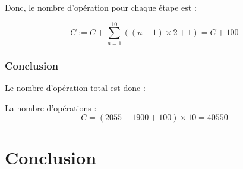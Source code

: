 \documentclass{article}
\begin{document}
Donc, le nombre d'opération pour chaque étape est :
\begin{tcolorbox}
    \[
    C := C + \sum_{n=1}^{10}((n-1) \times 2 + 1) = C + 100
\]
\end{tcolorbox}

\subsubsection{Conclusion}
Le nombre d'opération total est donc :

\begin{tcolorbox}[title={Conclusion}, fonttitle = \bfseries \sffamily]
    La nombre d'opérations :
    \[
    C = (2055 + 1900 + 100) \times 10 = 40550
\]
\end{tcolorbox}

\newpage
\section{Conclusion}
\end{document}
